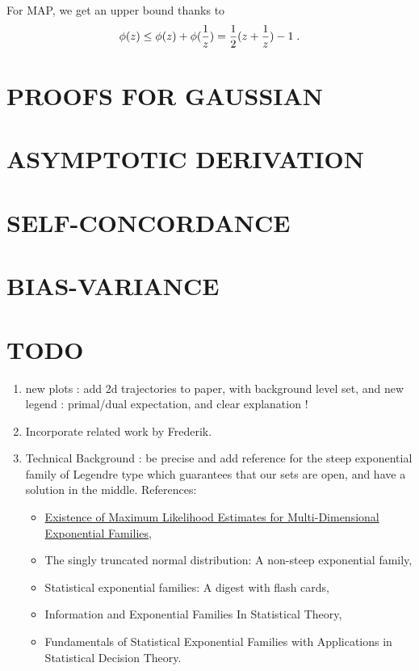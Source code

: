 \documentclass[twoside]{article}
\let\oldsection\section
\renewcommand{\section}[1]{\oldsection{\texorpdfstring{\uppercase{#1}}{#1}}}
\begin{document}
For MAP, we get an upper bound thanks to
\begin{align}
	\label{eq:log_bound}
	\phi(z) \leq \phi(z) + \phi(\frac{1}{z}) =  \frac{1}{2} (z + \frac{1}{z}) - 1 \; .
\end{align}

\section{PROOFS FOR GAUSSIAN}
\label{app:gaussian}

\section{ASYMPTOTIC DERIVATION}
\label{app:asymptote}

\section{SELF-CONCORDANCE}
\label{app:self-concordant}

\section{BIAS-VARIANCE}
\label{app:bias-variance}

\section{TODO}
\begin{enumerate}
	\item new plots : add 2d trajectories to paper, with background level set, and new legend : primal/dual expectation, and clear explanation !
	\item Incorporate related work by Frederik.
	\item Technical Background : be precise and add reference for the steep exponential family of Legendre type which guarantees that our sets are open, and have a solution in the middle.
	References: \begin{itemize}
		\item \href{https://www.jstor.org/stable/4616462?seq=1#metadata_info_tab_contents}{Existence of Maximum Likelihood Estimates for Multi-Dimensional Exponential Families},
		\item The singly truncated normal distribution: A non-steep exponential family,
		\item Statistical exponential families: A digest with flash cards,
		\item Information and Exponential Families In Statistical Theory,
		\item Fundamentals of Statistical Exponential Families with Applications in Statistical Decision Theory.
	\end{itemize}
\end{enumerate}
\end{document}
